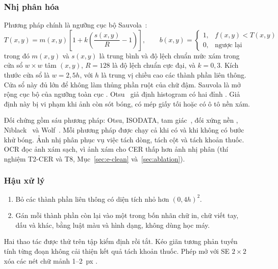 \subsubsection{Nhị phân hóa}
Phương pháp chính là ngưỡng cục bộ Sauvola~\cite{sauvola2000binarization}:
\begin{equation}\label{eq:sauvola}
  T(x,y)=m(x,y)\left[1+k\left(\frac{s(x,y)}{R}-1\right)\right],\qquad
  b(x,y)=\begin{cases}1, & f(x,y)<T(x,y)\\ 0, & \text{ngược lại}\end{cases}
\end{equation}
trong đó $m(x,y)$ và $s(x,y)$ là trung bình và độ lệch chuẩn mức xám trong cửa sổ $w\times w$ tâm $(x,y)$, $R=128$ là độ lệch chuẩn cực đại, và $k=0{,}3$.
Kích thước cửa sổ là $w=2{,}5h$, với $h$ là trung vị chiều cao các thành phần liên thông.
Cửa sổ này đủ lớn để không làm thủng phần ruột của chữ đậm.
Sauvola là mở rộng cục bộ của ngưỡng toàn cục .
Otsu~\cite{otsu1979threshold} giả định histogram có hai đỉnh .
Giả định này bị vi phạm khi ảnh còn sót bóng, có mép giấy tối hoặc có ô tô nền xám.

Đối chứng gồm sáu phương pháp: Otsu, ISODATA, tam giác~\cite{zack1977triangle}, đối xứng nền , Niblack~\cite{niblack1986introduction} và Wolf~\cite{wolf2002text}.
Mỗi phương pháp được chạy cả khi có và khi không có bước khử bóng.
Ảnh nhị phân phục vụ việc tách dòng, tách cột và tách khoản thuốc.
OCR đọc ảnh xám sạch, vì ảnh xám cho CER thấp hơn ảnh nhị phân (thí nghiệm T2-CER và T8, Mục~\ref{sec:e-clean} và~\ref{sec:ablation}).

\subsubsection{Hậu xử lý}
\begin{enumerate}
  \item Bỏ các thành phần liên thông có diện tích nhỏ hơn $(0{,}4h)^2$.
  \item Gán mỗi thành phần còn lại vào một trong bốn nhãn chữ in, chữ viết tay, dấu và khác, bằng luật màu và hình dạng, không dùng học máy.
\end{enumerate}
Hai thao tác được thử trên tập kiểm định rồi tắt.
Kéo giãn tương phản tuyến tính từng đoạn  không cải thiện kết quả tách khoản thuốc.
Phép mở với SE $2\times2$ xóa các nét chữ mảnh 1--2~px .
